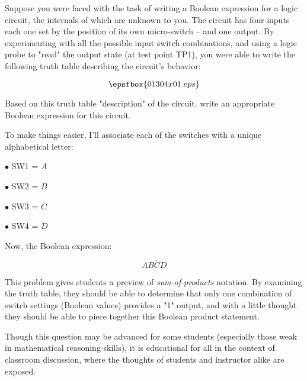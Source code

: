 

Suppose you were faced with the task of writing a Boolean expression for a logic circuit, the internals of which are unknown to you.  The circuit has four inputs -- each one set by the position of its own micro-switch -- and one output.  By experimenting with all the possible input switch combinations, and using a logic probe to "read" the output state (at test point TP1), you were able to write the following truth table describing the circuit's behavior:

$$\epsfbox{01304x01.eps}$$

Based on this truth table "description" of the circuit, write an appropriate Boolean expression for this circuit.







To make things easier, I'll associate each of the switches with a unique alphabetical letter:

\medskip
\item{$\bullet$} SW1 = $A$
\item{$\bullet$} SW2 = $B$
\item{$\bullet$} SW3 = $C$
\item{$\bullet$} SW4 = $D$
\medskip

Now, the Boolean expression:

$$AB\overline{C}D$$







This problem gives students a preview of {\it sum-of-products} notation.  By examining the truth table, they should be able to determine that only one combination of switch settings (Boolean values) provides a "1" output, and with a little thought they should be able to piece together this Boolean product statement. 

Though this question may be advanced for some students (especially those weak in mathematical reasoning skills), it is educational for all in the context of classroom discussion, where the thoughts of students and instructor alike are exposed.




